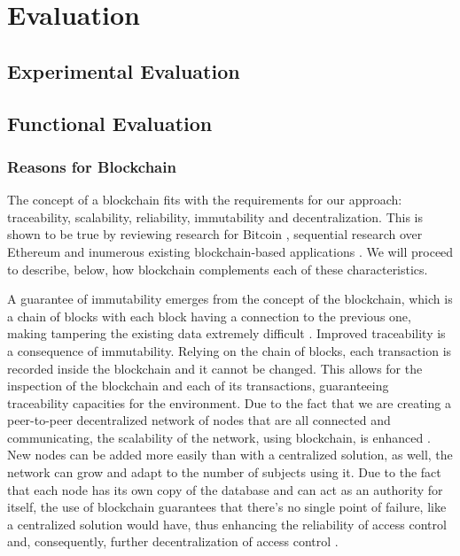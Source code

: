 \chapter{Evaluation}
\label{chap:evaluation}

\section{Experimental Evaluation}

\section{Functional Evaluation}

\subsection{Reasons for Blockchain}

The concept of a blockchain fits with the requirements for our approach: traceability, scalability, reliability, immutability and decentralization. This is shown to be true by reviewing research for Bitcoin \cite{nakamoto_bitcoin:_2008}, sequential research over Ethereum \cite{buterin_next-generation_2013, wood_ethereum:_2014} and inumerous existing blockchain-based applications \cite{pilkington_blockchain_2016, augot_identity_2017}. We will proceed to describe, below, how blockchain complements each of these characteristics.

A guarantee of immutability emerges from the concept of the blockchain, which is a chain of blocks with each block having a connection to the previous one, making tampering the existing data extremely difficult \cite{nakamoto_bitcoin:_2008,haber_how_1991,haber_secure_1997,bayer_improving_1993,eyal_bitcoin-ng:_2016}. Improved traceability is a consequence of immutability. Relying on the chain of blocks, each transaction \cite{nakamoto_bitcoin:_2008, chaum_security_1985, chaum_dining_1988, merkle_protocols_1980} is recorded inside the blockchain and it cannot be changed. This allows for the inspection of the blockchain and each of its transactions, guaranteeing traceability capacities for the environment. Due to the fact that we are creating a peer-to-peer decentralized network of nodes that are all connected and communicating, the scalability of the network, using blockchain, is enhanced \cite{nakamoto_bitcoin:_2008, castro_practical_2002}. New nodes can be added more easily than with a centralized solution, as well, the network can grow and adapt to the number of subjects using it. Due to the fact that each node has its own copy of the database and can act as an authority for itself, the use of blockchain guarantees that there's no single point of failure, like a centralized solution would have, thus enhancing the reliability of access control and, consequently, further decentralization of access control \cite{nakamoto_bitcoin:_2008, wood_ethereum:_2014}.

